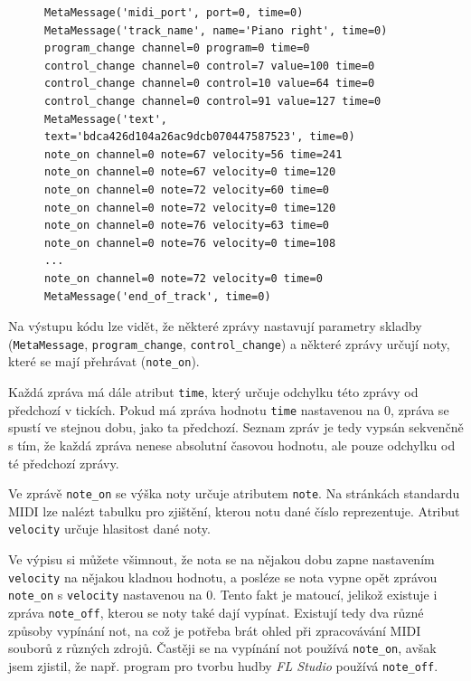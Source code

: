 \begin{figure}[!ht]
    \begin{verbatim}
MetaMessage('midi_port', port=0, time=0)
MetaMessage('track_name', name='Piano right', time=0)
program_change channel=0 program=0 time=0
control_change channel=0 control=7 value=100 time=0
control_change channel=0 control=10 value=64 time=0
control_change channel=0 control=91 value=127 time=0
MetaMessage('text', text='bdca426d104a26ac9dcb070447587523', time=0)
note_on channel=0 note=67 velocity=56 time=241
note_on channel=0 note=67 velocity=0 time=120
note_on channel=0 note=72 velocity=60 time=0
note_on channel=0 note=72 velocity=0 time=120
note_on channel=0 note=76 velocity=63 time=0
note_on channel=0 note=76 velocity=0 time=108
...
note_on channel=0 note=72 velocity=0 time=0
MetaMessage('end_of_track', time=0)
    \end{verbatim}
\end{figure}

Na výstupu kódu lze vidět, že některé zprávy nastavují parametry skladby (\lstinline{MetaMessage}, \lstinline{program_change}, \lstinline{control_change}) a některé zprávy určují noty, které se mají přehrávat (\lstinline{note_on}).

Každá zpráva má dále atribut \lstinline{time}, který určuje odchylku této zprávy od předchozí v tickích. Pokud má zpráva hodnotu \lstinline{time} nastavenou na 0, zpráva se spustí ve stejnou dobu, jako ta předchozí. Seznam zpráv je tedy vypsán sekvenčně s tím, že každá zpráva nenese absolutní časovou hodnotu, ale pouze odchylku od té předchozí zprávy.

Ve zprávě \lstinline{note_on} se výška noty určuje atributem \lstinline{note}. Na stránkách standardu MIDI \cite{midi-standard} lze nalézt tabulku pro zjištění, kterou notu dané číslo reprezentuje. Atribut \lstinline{velocity} určuje hlasitost dané noty.

Ve výpisu si můžete všimnout, že nota se na nějakou dobu zapne nastavením \lstinline{velocity} na nějakou kladnou hodnotu, a posléze se nota vypne opět zprávou \lstinline{note_on} s \lstinline{velocity} nastavenou na 0. Tento fakt je matoucí, jelikož existuje i zpráva \lstinline{note_off}, kterou se noty také dají vypínat. Existují tedy dva různé způsoby vypínání not, na což je potřeba brát ohled při zpracovávání MIDI souborů z různých zdrojů. Častěji se na vypínání not používá \lstinline{note_on}, avšak jsem zjistil, že např. program pro tvorbu hudby \textit{FL Studio} používá \lstinline{note_off}.

